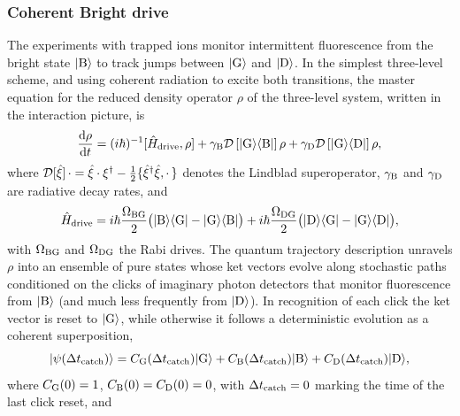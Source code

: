 \documentclass[
						superscriptaddress, 																 amsmath, amssymb,
		 aps,  prb,  
										floatfix,
		linenumbers,
			]{revtex4-1}
\begin{document}
\subsubsection{Coherent Bright drive} 
The experiments with trapped ions \cite{Nagourney1986,Sauter1986,Bergquist1986} monitor intermittent fluorescence from the bright state $|{\rm B}\rangle$ to track jumps between $|{\rm G}\rangle$ and $|{\rm D}\rangle$.\cite{Cook1985} In the simplest three-level scheme,\cite{Bergquist1986} and using coherent radiation to excite both  transitions, the master equation for the reduced density operator $\rho$  of the three-level system, written in the interaction picture, is
\begin{equation}
\frac{\mathrm{d}\rho}{\mathrm{d}t}=(i\hbar)^{-1}[\hat H_{\rm drive},\rho]+\gamma_{\rm B}{\cal D}\left[|{\rm G}\rangle\langle{\rm B}|\right]\rho+\gamma_{\rm D}{\cal D}\left[|{\rm G}\rangle\langle{\rm D}|\right]\rho,
\end{equation}
where ${\cal D}[\hat \xi]\mkern3mu\cdot=\hat \xi\cdot \xi^\dagger-\frac12\{\hat \xi^\dagger\hat \xi,\cdot\mkern3mu\}$ denotes the Lindblad superoperator, $\gamma_{\rm B}$ and $\gamma_{\rm D}$ are radiative decay rates, and
\begin{equation}
\hat H_{\rm drive}=i\hbar\frac{\Omega_{\rm BG}}2\big(|{\rm B}\rangle\langle {\rm G}|-|{\rm G}\rangle\langle{\rm B}|\big)+i\hbar\frac{\Omega_{\rm DG}}2\big(|{\rm D}\rangle\langle{\rm G}|-|{\rm G}\rangle\langle{\rm D}|\big),
\label{eqn:drive_coherent_fluorescence}
\end{equation}
with $\Omega_{\rm BG}$ and $\Omega_{\rm DG}$ the Rabi drives. The quantum trajectory description\cite{Carmichael1993,Dalibard1992-original-traj,Dum1992} unravels $\rho$ into an ensemble of pure states whose ket vectors evolve along stochastic paths conditioned on the clicks of imaginary photon detectors that monitor fluorescence from $|{\rm B}\rangle$ (and much less frequently from $|{\rm D}\rangle$). In recognition of each click the ket vector is reset to $|{\rm G}\rangle$, while otherwise it follows a deterministic evolution as a coherent superposition,
\begin{equation}
|\psi(\Delta t_{\rm catch})\rangle=C_{\rm G}(\Delta t_{\rm catch})|{\rm G}\rangle+C_{\rm B}(\Delta t_{\rm catch})|{\rm B}\rangle+C_{\rm D}(\Delta t_{\rm catch})|{\rm D}\rangle,
\label{eqn:GBD-ket}
\end{equation}
where $C_{\rm G}(0)=1$, $C_{\rm B}(0)=C_{\rm D}(0)=0$, with $\Delta t_{\rm catch}=0$ marking the time of the last click reset, and
\end{document}

